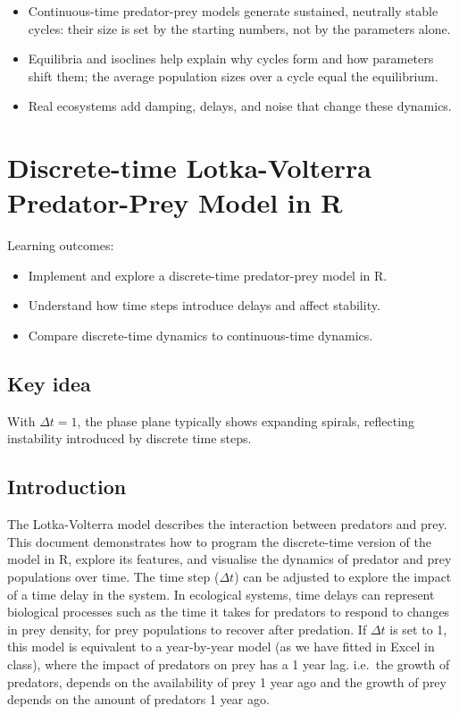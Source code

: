 \documentclass[
  a4paper]{book}
\providecommand{\tightlist}{%
  \setlength{\itemsep}{0pt}\setlength{\parskip}{0pt}}
\begin{document}
\begin{itemize}
\tightlist
\item
  Continuous-time predator-prey models generate sustained, neutrally stable cycles: their size is set by the starting numbers, not by the parameters alone.
\item
  Equilibria and isoclines help explain why cycles form and how parameters shift them; the average population sizes over a cycle equal the equilibrium.
\item
  Real ecosystems add damping, delays, and noise that change these dynamics.
\end{itemize}

\chapter{Discrete-time Lotka-Volterra Predator-Prey Model in R}\label{discrete-time-lotka-volterra-predator-prey-model-in-r}

Learning outcomes:

\begin{itemize}
\tightlist
\item
  Implement and explore a discrete-time predator-prey model in R.
\item
  Understand how time steps introduce delays and affect stability.
\item
  Compare discrete-time dynamics to continuous-time dynamics.
\end{itemize}

\section{Key idea}\label{key-idea-3}

With \(\Delta t = 1\), the phase plane typically shows expanding spirals, reflecting instability introduced by discrete time steps.

\section{Introduction}\label{introduction}

The Lotka-Volterra model describes the interaction between predators and prey. This document demonstrates how to program the discrete-time version of the model in R, explore its features, and visualise the dynamics of predator and prey populations over time. The time step (\(\Delta t\)) can be adjusted to explore the impact of a time delay in the system. In ecological systems, time delays can represent biological processes such as the time it takes for predators to respond to changes in prey density, for prey populations to recover after predation. If \(\Delta t\) is set to 1, this model is equivalent to a year-by-year model (as we have fitted in Excel in class), where the impact of predators on prey has a 1 year lag. i.e.~the growth of predators, depends on the availability of prey 1 year ago and the growth of prey depends on the amount of predators 1 year ago.
\end{document}
